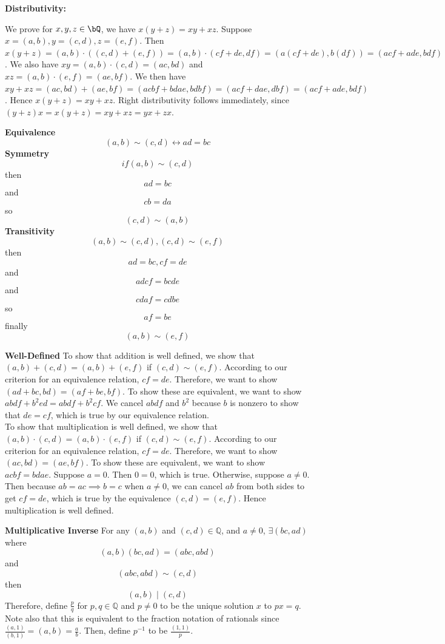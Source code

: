 \noindent\textbf{Distributivity: }

We prove for $x,y,z\in \bQ$, we have $x(y+z)=xy+xz$. Suppose $x=(a,b),y=(c,d),z=(e,f)$. Then $x(y+z)=(a,b)\cdot((c,d)+(e,f))=(a,b)\cdot(cf+de,df)=(a(cf+de),b(df))=(acf+ade,bdf)$. We also have $xy=(a,b)\cdot(c,d)=(ac,bd)$ and $xz=(a,b)\cdot(e,f)=(ae,bf)$. We then have $xy+xz=(ac,bd)+(ae,bf)=(acbf+bdae,bdbf)=(acf+dae,dbf)=(acf+ade,bdf)$. Hence $x(y+z)=xy+xz$. Right distributivity follows immediately, since $(y+z)x=x(y+z)=xy+xz=yx+zx$.

\noindent\textbf{Equivalence}
\[
(a,b)\sim(c,d) \longleftrightarrow ad=bc
\]
\noindent\textbf{Symmetry}
\[
if (a,b)\sim(c,d)
\]
then
\[
ad=bc
\]
and
\[
cb=da
\]
so
\[
(c,d)\sim(a,b)
\]
\noindent\textbf{Transitivity}
\[
(a,b)\sim(c,d),(c,d)\sim(e,f)
\]
then
\[
ad=bc, cf=de
\]
and
\[
adcf=bcde
\]
and
\[
cdaf=cdbe
\]
so
\[
af=be
\]
finally
\[
(a,b)\sim(e,f)
\]




\noindent\textbf{Well-Defined}
To show that addition is well defined, we show that $(a,b) + (c,d) = (a,b)+(e,f)$ if $(c,d) \sim (e,f)$. According to our criterion for an equivalence relation, $cf = de$. Therefore, we want to show $(ad+bc, bd) = (af+be, bf)$. To show these are equivalent, we want to show $abdf+b^2ed=abdf+b^2cf$. We cancel $abdf$ and $b^2$ because $b$ is nonzero to show that $de=cf$, which is true by our equivalence relation. \\

To show that multiplication is well defined, we show that $(a,b) \cdot (c,d) = (a,b)\cdot(e,f)$ if $(c,d) \sim (e,f)$. According to our criterion for an equivalence relation, $cf = de$. Therefore, we want to show $(ac, bd) = (ae, bf)$. To show these are equivalent, we want to show $acbf=bdae$. Suppose $a=0$. Then $0=0$, which is true. Otherwise, suppose $a\neq0$. Then because $ab=ac\implies b=c$ when $a\neq0$, we can cancel $ab$ from both sides to get $cf=de$, which is true by the equivalence $(c,d)=(e,f)$. Hence multiplication is well defined.




\noindent\textbf{Multiplicative Inverse}
For any $(a,b)$ and $(c,d)\in\mathbb{Q}$, and $a\neq0$, $\exists(bc,ad)$ where
\[
(a,b)(bc,ad)=(abc,abd)
\]
and
\[
(abc,abd)\sim(c,d)
\]
then
\[
(a,b)\mid(c,d)
\]
Therefore, define $\frac{p}{q}$ for $p,q\in\mathbb{Q}$ and $p\neq0$ to be the unique solution $x$ to $px=q$. Note also that this is equivalent to the fraction notation of rationals since $\frac{(a,1)}{(b,1)}=(a,b)=\frac{a}{b}$. Then, define $p^{-1}$ to be $\frac{(1,1)}{p}$.